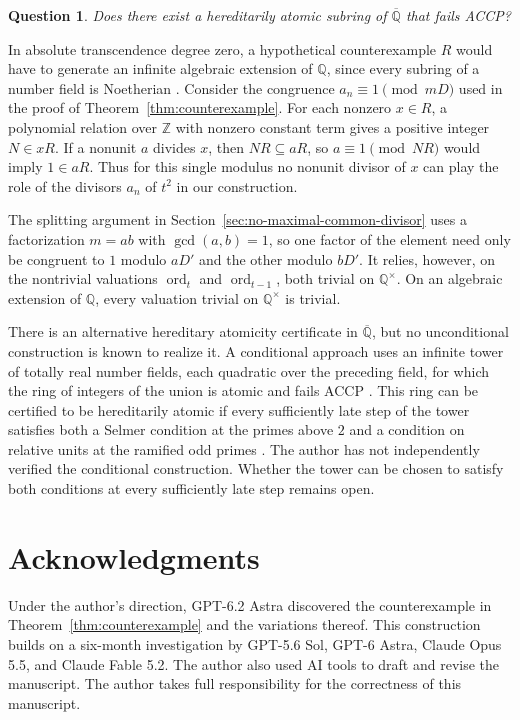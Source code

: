 \documentclass{article}
\DeclareMathOperator{\ord}{ord}
\newtheorem{question}[proposition]{Question}
\theoremstyle{remark}
\begin{document}
\begin{question}
    Does there exist a hereditarily atomic subring of $\overline{\mathbb{Q}}$ that fails ACCP?
\end{question}

In absolute transcendence degree zero, a hypothetical counterexample $R$ would have to generate an infinite algebraic extension of $\mathbb{Q}$, since every subring of a number field is Noetherian \cite[Theorem~3]{Gilmer}.
Consider the congruence $a_n \equiv 1 \pmod{mD}$ used in the proof of Theorem~\ref{thm:counterexample}.
For each nonzero $x \in R$, a polynomial relation over $\mathbb{Z}$ with nonzero constant term gives a positive integer $N \in xR$.
If a nonunit $a$ divides $x$, then $NR \subseteq aR$, so $a \equiv 1 \pmod{NR}$ would imply $1 \in aR$.
Thus for this single modulus no nonunit divisor of $x$ can play the role of the divisors $a_n$ of $t^2$ in our construction.

The splitting argument in Section~\ref{sec:no-maximal-common-divisor} uses a factorization $m = ab$ with $\gcd(a, b) = 1$, so one factor of the element need only be congruent to $1$ modulo $aD'$ and the other modulo $bD'$.
It relies, however, on the nontrivial valuations $\ord_t$ and $\ord_{t - 1}$, both trivial on $\mathbb{Q}^\times$.
On an algebraic extension of $\mathbb{Q}$, every valuation trivial on $\mathbb{Q}^\times$ is trivial.

There is an alternative hereditary atomicity certificate in $\overline{\mathbb{Q}}$, but no unconditional construction is known to realize it.
A conditional approach uses an infinite tower of totally real number fields, each quadratic over the preceding field, for which the ring of integers of the union is atomic and fails ACCP \cite[Theorem~A]{ConditionalHA}.
This ring can be certified to be hereditarily atomic if every sufficiently late step of the tower satisfies both a Selmer condition at the primes above $2$ and a condition on relative units at the ramified odd primes \cite[Theorem~B]{ConditionalHA}.
The author has not independently verified the conditional construction.
Whether the tower can be chosen to satisfy both conditions at every sufficiently late step remains open.

\section{Acknowledgments}

Under the author's direction, GPT-6.2 Astra discovered the counterexample in Theorem~\ref{thm:counterexample} and the variations thereof.
This construction builds on a six-month investigation by GPT-5.6 Sol, GPT-6 Astra, Claude Opus 5.5, and Claude Fable 5.2.
The author also used AI tools to draft and revise the manuscript.
The author takes full responsibility for the correctness of this manuscript.
\end{document}
